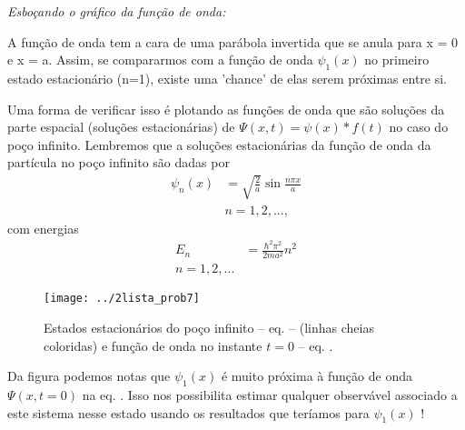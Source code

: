 \documentclass[red]{mecanica_quantica}
\begin{document}
		
	\emph{Esboçando o gráfico da função de onda:}
	
A função de onda tem a cara de uma parábola invertida que se anula para x = 0 e x = a. Assim, se compararmos com a função de onda $\psi_1(x)$ no primeiro estado estacionário (n=1), existe uma 'chance' de elas serem próximas entre si. 

\begin{minipage}{\linewidth}
      \centering
      \begin{minipage}{0.325\linewidth}
Uma forma de verificar isso é plotando as funções de onda que são soluções da parte espacial (soluções estacionárias) de $\Psi(x,t) = \psi(x) * f(t)$ no caso do poço infinito.
	Lembremos que a soluções estacionárias da função de onda da partícula no poço infinito são dadas por
		\begin{align}
		\label{eq:Psipoco}
			\psi_n(x) & = \sqrt{\frac{2}{a}} \sin{\frac{n\pi x}{a}}  \nonumber \\ 
			& n = 1, 2, ...,
		\end{align}
		com energias
		\begin{align}
		\label{eq:energiapoco}
			E_n & = \frac{\hbar^2 \pi^2}{2m a^2} n^2 \nonumber \\
			n = 1, 2, ...
		\end{align}
	


      \end{minipage}
      \hspace{0.05\linewidth}
      \begin{minipage}{0.6\linewidth}
 
       	\begin{figure}[H]
	\begin{center}
		\texttt{[image: ../2lista\_prob7]}
		\caption{Estados estacionários do poço infinito -- eq.   -- (linhas cheias coloridas) e função de onda no instante $t=0$ -- eq. . }
		\label{fig:funcaodeonda}
	\end{center}
	\end{figure}    


      \end{minipage}
  \end{minipage}

 


Da figura  podemos notas que $\psi_1(x)$ é muito próxima à função de onda $\Psi(x,t=0)$ na eq. . Isso nos possibilita estimar qualquer observável associado a este sistema nesse estado usando os resultados que teríamos para $\psi_1(x)$ ! 
\end{document}
